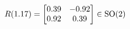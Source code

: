 \documentclass[preview]{standalone}
\begin{document}
\begin{align*}
\special{dvisvgm:raw <g id='unique000'>}R(1.17) = \begin{bmatrix} 0.39 & -0.92 \\ 0.92 & 0.39 \end{bmatrix} \in \text{SO}(2)\special{dvisvgm:raw </g>}
\end{align*}
\end{document}
